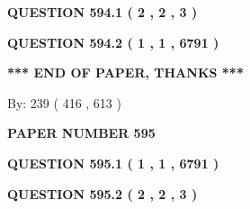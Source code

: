 \documentclass[12pt]{article}
\begin{document}
   
   
   
 \vspace{0.2in}
 
 
 
 
   
   
  
\vspace{0.2in}
  
{\textbf{\Large{QUESTION
594.1 
 ( 2 , 2 , 3 )
}}}
  
  
  
\vspace{0.2in}
  
{\textbf{\Large{QUESTION
594.2 
 ( 1 , 1 , 6791 )
}}}
  
  
   
   
 \vspace{0.2in}
 
   
   
   
   
\vspace{1.0in} 
{\textbf{\large{ *** END OF PAPER, THANKS *** }}} 
   
   
\hspace{1.0in} By: 
 239 ( 416 ,  613 )
   
   
   
   
\newpage 
\setcounter{page}{ 
   595001 } 
   
   
   
   
 {\textbf{ \Large{ PAPER NUMBER  595  }}}
   
   
\vspace{0.2in}
   
   
   
   
   
   
 \vspace{0.2in}
 
 
 
 
   
   
  
\vspace{0.2in}
  
{\textbf{\Large{QUESTION
595.1 
 ( 1 , 1 , 6791 )
}}}
  
  
  
\vspace{0.2in}
  
{\textbf{\Large{QUESTION
595.2 
 ( 2 , 2 , 3 )
}}}
  
  
   
   
 \vspace{0.2in}
 
\end{document}
